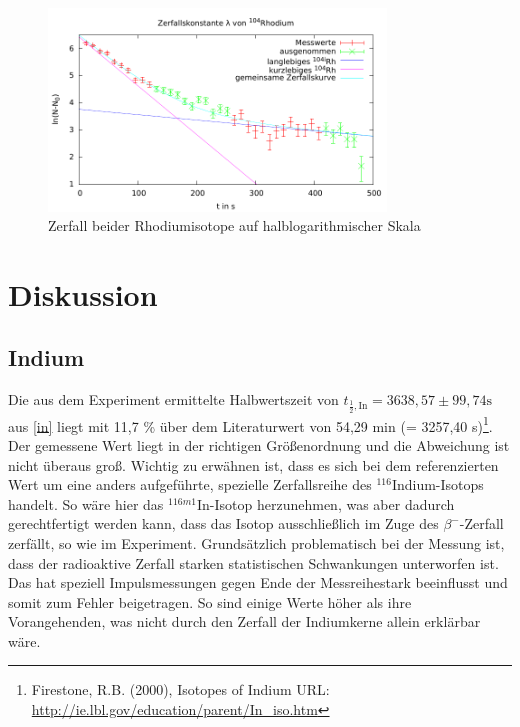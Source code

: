 \begin{figure}[h]
	\includegraphics[width=0.8\textwidth]{pics/Rhodium.pdf}
	\caption{Zerfall beider Rhodiumisotope auf halblogarithmischer Skala}
\end{figure}


\section{Diskussion}
\subsection{Indium}
Die aus dem Experiment ermittelte Halbwertszeit von $t_{\frac12,\text{In}} = 3638,57 \pm 99,74 \text{s}$ aus \eqref{in} liegt mit 11,7 \% über dem
Literaturwert von 54,29 min (= 3257,40 s)\footnote[1]{Firestone, R.B. (2000), Isotopes of Indium URL: \href{http://ie.lbl.gov/education/parent/In\_iso.htm}{http://ie.lbl.gov/education/parent/In\_iso.htm}}.
Der gemessene Wert liegt in der richtigen Größenordnung und die Abweichung ist nicht überaus groß. Wichtig zu erwähnen ist, dass es
sich bei dem referenzierten Wert um eine anders aufgeführte, spezielle Zerfallsreihe des $^{116}$Indium-Isotops handelt. So wäre hier
das $^{116m1}$In-Isotop herzunehmen, was aber dadurch gerechtfertigt werden kann, dass das Isotop ausschließlich im Zuge des $\beta^-$-Zerfall
zerfällt, so wie im Experiment. Grundsätzlich problematisch bei der Messung ist, dass der radioaktive Zerfall starken statistischen Schwankungen unterworfen ist.
Das hat speziell Impulsmessungen gegen Ende der Messreihestark beeinflusst und somit zum Fehler beigetragen. So sind einige Werte höher 
als ihre Vorangehenden, was nicht durch den Zerfall der Indiumkerne allein erklärbar wäre.

